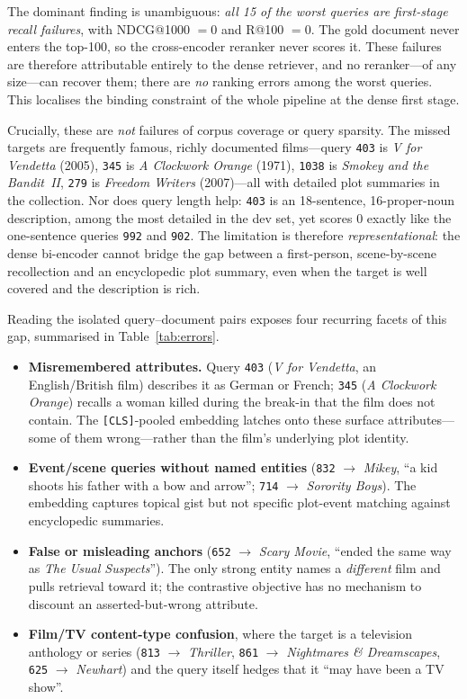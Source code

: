 \documentclass[conference]{IEEEtran}
\begin{document}
The dominant finding is unambiguous: \emph{all 15 of the worst queries are
first-stage recall failures}, with NDCG@1000 $=0$ and R@100 $=0$. The gold
document never enters the top-100, so the cross-encoder reranker never scores
it. These failures are therefore attributable entirely to the dense retriever,
and no reranker---of any size---can recover them; there are \emph{no} ranking
errors among the worst queries. This localises the binding constraint of the
whole pipeline at the dense first stage.

Crucially, these are \emph{not} failures of corpus coverage or query sparsity.
The missed targets are frequently famous, richly documented films---query
\texttt{403} is \emph{V for Vendetta} (2005), \texttt{345} is \emph{A Clockwork
Orange} (1971), \texttt{1038} is \emph{Smokey and the Bandit~II}, \texttt{279}
is \emph{Freedom Writers} (2007)---all with detailed plot summaries in the
collection. Nor does query length help: \texttt{403} is an 18-sentence,
16-proper-noun description, among the most detailed in the dev set, yet scores
$0$ exactly like the one-sentence queries \texttt{992} and \texttt{902}. The
limitation is therefore \emph{representational}: the dense bi-encoder cannot
bridge the gap between a first-person, scene-by-scene recollection and an
encyclopedic plot summary, even when the target is well covered and the
description is rich.

Reading the isolated query--document pairs exposes four recurring facets of
this gap, summarised in Table~\ref{tab:errors}.
\begin{itemize}
    \item \textbf{Misremembered attributes.} Query \texttt{403}
          (\emph{V for Vendetta}, an English/British film) describes it as
          German or French; \texttt{345} (\emph{A Clockwork Orange}) recalls a
          woman killed during the break-in that the film does not contain. The
          \texttt{[CLS]}-pooled embedding latches onto these surface
          attributes---some of them wrong---rather than the film's underlying
          plot identity.
    \item \textbf{Event/scene queries without named entities} (\texttt{832}
          $\to$ \emph{Mikey}, ``a kid shoots his father with a bow and
          arrow''; \texttt{714} $\to$ \emph{Sorority Boys}). The embedding
          captures topical gist but not specific plot-event matching against
          encyclopedic summaries.
    \item \textbf{False or misleading anchors} (\texttt{652} $\to$
          \emph{Scary Movie}, ``ended the same way as \emph{The Usual
          Suspects}''). The only strong entity names a \emph{different} film
          and pulls retrieval toward it; the contrastive objective has no
          mechanism to discount an asserted-but-wrong attribute.
    \item \textbf{Film/TV content-type confusion}, where the target is a
          television anthology or series (\texttt{813} $\to$ \emph{Thriller},
          \texttt{861} $\to$ \emph{Nightmares \& Dreamscapes}, \texttt{625}
          $\to$ \emph{Newhart}) and the query itself hedges that it ``may have
          been a TV show''.
\end{itemize}
\end{document}
